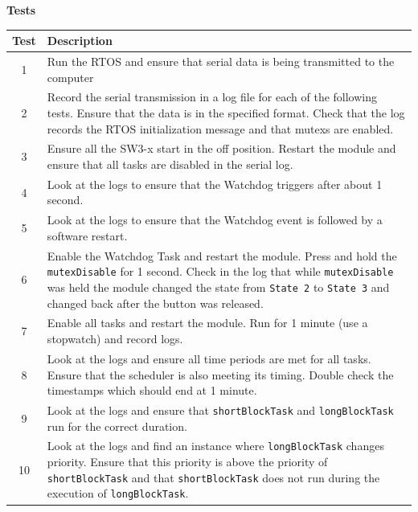 \documentclass{article}
\begin{document}
\begin{center}
    \textbf{Tests} \\
    \vspace{0.5em}
    \begin{tabular}{| c | p{35em} |}
    \hline
    \textbf{Test} & \textbf{Description} \\ \hline
    1 & Run the RTOS and ensure that serial data is being transmitted to the computer \\ \hline
    2 & Record the serial transmission in a log file for each of the following tests. Ensure that the data is in the specified format. Check that the log records the RTOS initialization message and that mutexs are enabled. \\ \hline
    3 & Ensure all the SW3-x start in the off position. Restart the module and ensure that all tasks are disabled in the serial log. \\ \hline
    4 & Look at the logs to ensure that the Watchdog triggers after about 1 second. \\ \hline
    5 & Look at the logs to ensure that the Watchdog event is followed by a software restart. \\ \hline
    6 & Enable the Watchdog Task and restart the module. Press and hold the \texttt{mutexDisable} for 1 second. Check in the log that while \texttt{mutexDisable} was held the module changed the state from \texttt{State 2} to \texttt{State 3} and changed back after the button was released. \\ \hline
    7 & Enable all tasks and restart the module. Run for 1 minute (use a stopwatch) and record logs. \\ \hline
    8 & Look at the logs and ensure all time periods are met for all tasks. Ensure that the scheduler is also meeting its timing. Double check the timestamps which should end at 1 minute. \\ \hline
    9 & Look at the logs and ensure that \texttt{shortBlockTask} and \texttt{longBlockTask} run for the correct duration. \\ \hline
    10 & Look at the logs and find an instance where \texttt{longBlockTask} changes priority. Ensure that this priority is above the priority of \texttt{shortBlockTask} and that \texttt{shortBlockTask} does not run during the execution of \texttt{longBlockTask}. \\ \hline
    \end{tabular}
\end{center}

\vspace*{2em}
\end{document}
